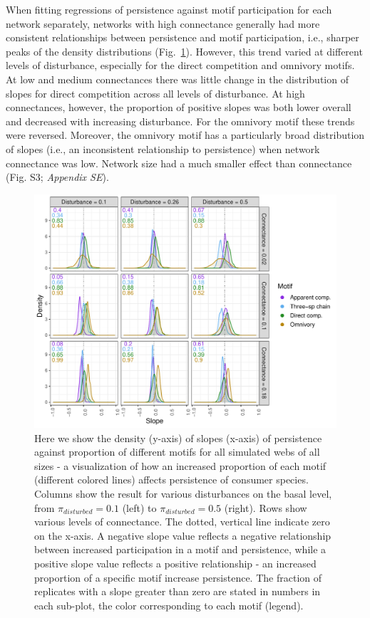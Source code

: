 \documentclass[12pt]{article}
\begin{document}
\begin{spacing}{2.0}
            When fitting regressions of persistence against motif participation for each network separately, networks with high connectance generally had more consistent relationships between persistence and motif participation, i.e., sharper peaks of the density distributions (Fig.~\ref{fig:density_prop_C}).
            However, this trend varied at different levels of disturbance, especially for the direct competition and omnivory motifs.
            At low and medium connectances there was little change in the distribution of slopes for direct competition across all levels of disturbance. 
            At high connectances, however, the proportion of positive slopes was both lower overall and decreased with increasing disturbance. 
            For the omnivory motif these trends were reversed. 
            Moreover, the omnivory motif has a particularly broad distribution of slopes (i.e., an inconsistent relationship to persistence) when network connectance was low. 
            Network size had a much smaller effect than connectance (Fig. S3; \emph{Appendix SE}).


        \begin{figure}[h!]
            \centering
            \includegraphics[width=\textwidth]{figures/prop_dens_bp_vs_C_allS.pdf}
            \caption{Here we show the density (y-axis) of slopes (x-axis) of persistence against proportion of different motifs for all simulated webs of all sizes - a visualization of how an increased proportion of each motif (different colored lines) affects persistence of consumer species. Columns show the result for various disturbances on the basal level, from $\pi_{disturbed} = 0.1$ (left) to $\pi_{disturbed} = 0.5$ (right). Rows show various levels of connectance. The dotted, vertical line indicate zero on the x-axis. A negative slope value reflects a negative relationship between increased participation in a motif and persistence, while a positive slope value reflects a positive relationship - an increased proportion of a specific motif increase persistence. The fraction of replicates with a slope greater than zero are stated in numbers in each sub-plot, the color corresponding to each motif (legend). }
            \label{fig:density_prop_C}
        \end{figure}    
    

\end{spacing}
\end{document}
